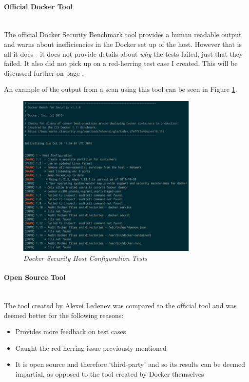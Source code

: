 \documentclass{article}
\begin{document}
\paragraph{Official Docker Tool}\mbox{}\\
The official Docker Security Benchmark tool provides a human readable output and warns about inefficiencies in the Docker set up of the host. However that is all it does - it does not provide details about \textit{why} the tests failed, just that they failed. It also did not pick up on a red-herring test case I created. This will be discussed further on page \pageref{par:untrusted}.

An example of the output from a scan using this tool can be seen in Figure \ref{fig:host_config}.

\begin{figure}[!h]
\centering
\includegraphics*[width=0.8\textwidth]{components/images/docker-benchmark-host-configuration}
\caption{\em Docker Security Host Configuration Tests}
\label{fig:host_config}
\end{figure}

\paragraph{Open Source Tool}\mbox{}\\
The tool created by Alexei Ledenev was compared to the official tool and was deemed better for the following reasons:

\begin{itemize}
  \item Provides more feedback on test cases
  \item Caught the red-herring issue previously mentioned
  \item It is open source and therefore `third-party' and so its results can be deemed impartial, as opposed to the tool created by Docker themselves
\end{itemize}
\end{document}
